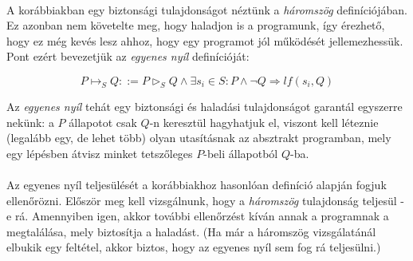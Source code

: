 \documentclass[12pt]{article}
\begin{document}
\paragraph{}
A korábbiakban egy biztonsági tulajdonságot néztünk a \textit{háromszög} definíciójában. Ez azonban nem követelte meg, hogy haladjon is a programunk, így érezhető, hogy ez még kevés lesz ahhoz, hogy egy programot jól működését jellemezhessük. Pont ezért bevezetjük az \textit{egyenes nyíl} definícióját:

$$P \mapsto_S Q ::= P \vartriangleright_S Q \land \exists s_i \in S: P \land \neg Q \Rightarrow lf(s_i, Q) $$

Az \textit{egyenes nyíl} tehát egy biztonsági és haladási tulajdonságot garantál egyszerre nekünk: a $P$ állapotot csak $Q$-n keresztül hagyhatjuk el, viszont kell léteznie (legalább egy, de lehet több) olyan utasításnak az absztrakt programban, mely egy lépésben átvisz minket tetszőleges $P$-beli állapotból $Q$-ba.
\paragraph{}
Az egyenes nyíl teljesülését a korábbiakhoz hasonlóan definíció alapján fogjuk ellenőrözni. Először meg kell vizsgálnunk, hogy a \textit{háromszög} tulajdonság teljesül -e rá. Amennyiben igen, akkor további ellenőrzést kíván annak a programnak a megtalálása, mely biztosítja a haladást. (Ha már a háromszög vizsgálatánál elbukik egy feltétel, akkor biztos, hogy az egyenes nyíl sem fog rá teljesülni.)
\end{document}
